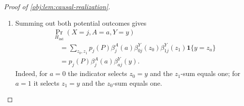 \documentclass[11pt]{article}
\begin{document}
\begin{proof}[Proof of \cref{obj:lem:causal-realization}]
\begin{enumerate}
Define the treatment and potential-outcome Bernoulli masses by
\[
\beta^A_j(a)=
\begin{cases}
1-e_j(P),&a=0,\\
e_j(P),&a=1,
\end{cases}
\qquad
\beta^Y_{aj}(z)=
\begin{cases}
1-\mu_{aj}(P),&z=0,\\
\mu_{aj}(P),&z=1.
\end{cases}
\]
These definitions apply to every cell and arm, including those with
zero mass. By \cref{obj:synth_7}, they are nonnegative and satisfy
\[
\sum_a\beta^A_j(a)=1,\qquad
\sum_z\beta^Y_{aj}(z)=1.
\]
For a binary pair \((z_0,z_1)\), write
\[
z_a=
\begin{cases}
z_0,&a=0,\\
z_1,&a=1.
\end{cases}
\]
Construct \(H_{\mathrm{ind}}\) through its atom masses:
\[
\Pr_{H_{\mathrm{ind}}}
 (X=j,A=a,Y=y,Y_0=z_0,Y_1=z_1)
=
p_j(P)\beta^A_j(a)
\beta^Y_{0j}(z_0)\beta^Y_{1j}(z_1)
\mathbf1\{y=z_a\}.
\]
Every entry is nonnegative. Summing the factual-outcome indicator
first and then the remaining binary coordinates yields
\[
\begin{aligned}
&\sum_{j=1}^{d}\sum_{a,y,z_0,z_1}
\Pr_{H_{\mathrm{ind}}}
 (X=j,A=a,Y=y,Y_0=z_0,Y_1=z_1)\\
&\quad=
\sum_{j=1}^{d}p_j(P)
 \left(\sum_a\beta^A_j(a)\right)
 \left(\sum_{z_0}\beta^Y_{0j}(z_0)\right)
 \left(\sum_{z_1}\beta^Y_{1j}(z_1)\right)
=1.
\end{aligned}
\]
Hence the displayed table defines a probability law; normalization
preserves its atom masses.

\item
Summing out both potential outcomes gives
\[
\begin{aligned}
&\Pr_{H_{\mathrm{ind}}}(X=j,A=a,Y=y)\\
&\quad=
\sum_{z_0,z_1}
p_j(P)\beta^A_j(a)
\beta^Y_{0j}(z_0)\beta^Y_{1j}(z_1)
\mathbf1\{y=z_a\}\\
&\quad=p_j(P)\beta^A_j(a)\beta^Y_{aj}(y).
\end{aligned}
\]
Indeed, for \(a=0\) the indicator selects \(z_0=y\) and the
\(z_1\)-sum equals one; for \(a=1\) it selects \(z_1=y\) and the
\(z_0\)-sum equals one.


\end{enumerate}
\end{proof}
\end{document}
